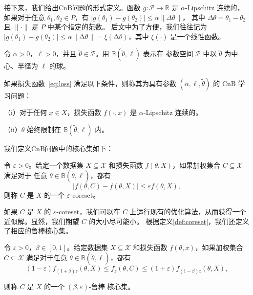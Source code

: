 接下来，我们给出CnB问题的形式定义。函数 $g: \mathcal{P} \rightarrow \mathbb{R}$ 是 $\alpha$-Lipschitz 连续的，
如果对于任意 $\theta_1, \theta_2 \in P$，有 $|g(\theta_1) - g(\theta_2)| \leq \alpha \|\Delta \theta\|$，
其中 $\Delta \theta = \theta_1 - \theta_2$ 且 $\|\cdot\|$ 是 $P$ 中某个指定的范数。
后文中为了方便，我们往往记为$|g(\theta_1) - g(\theta_2)| \leq \alpha \|\increment \theta\| = \xi(\increment \theta)$，其中 $\xi(\cdot)$ 是一个线性函数。


\begin{definition}[CnB 问题]
  令 $\alpha > 0$，$\ell > 0$，并且 $\tilde{\theta} \in \mathcal{P}$。用 $\mathbb{B}(\tilde{\theta}, \ell)$ 表示在
  参数空间 $\mathcal{P}$ 中以 $\tilde{\theta}$ 为中心、半径为 $\ell$ 的球。

如果损失函数~\eqref{eq:loss} 满足以下条件，则称其为具有参数 $(\alpha, \ell, \tilde{\theta})$ 的 CnB 学习问题：

（i）对于任何 $x \in X$，损失函数 $f(\cdot, x)$ 是 $\alpha$-Lipschitz 连续的。

（ii）$\theta$ 始终限制在 $\mathbb{B}(\tilde{\theta}, \ell)$ 内。
\label{def:CnB}
\end{definition}

我们定义CnB问题中的核心集如下：

\begin{definition}
  令 $\varepsilon > 0$。给定一个数据集 $X \subseteq \mathcal{X}$ 
  和损失函数 $f(\theta, X)$，如果加权集合 $C \subseteq \mathcal{X}$ 满足对于
  任意 $\theta \in \mathbb{B}(\tilde{\theta}, \ell)$，都有
  \begin{equation*}
  |f(\theta, C) - f(\theta, X)| \leq \varepsilon f(\theta, X),
  \end{equation*}
则称 $C$ 是 $X$ 的一个 $\varepsilon$-coreset。
\label{def:coreset}
\end{definition}


如果 $C$ 是 $X$ 的 $\varepsilon$-coreset，我们可以在 $C$ 上运行现有的优化算法，从而获得一个近似解。显然，我们期望 $C$ 的大小尽可能小。
根据定义\ref{def:coreset}，我们还定义了相应的鲁棒核心集。


\begin{definition}[鲁棒核心集]
  令 $\varepsilon > 0$，$\beta \in [0, 1]$。给定数据集 $X \subseteq \mathcal{X}$ 
  和损失函数 $f(\theta, x)$，如果加权集合 $C \subseteq \mathcal{X}$ 满足对于任意 $\theta \in \mathbb{B}(\tilde{\theta}, \ell)$，都有
  \begin{equation*}
  (1 - \varepsilon) f_{(1+\beta)z}(\theta, X) \leq f_z(\theta, C) \leq (1 + \varepsilon) f_{(1-\beta)z}(\theta, X),
  \end{equation*}

则称 $C$ 是 $X$ 的一个 $(\beta, \varepsilon)$-鲁棒 核心集。
\label{def:robust coreset}
\end{definition}



